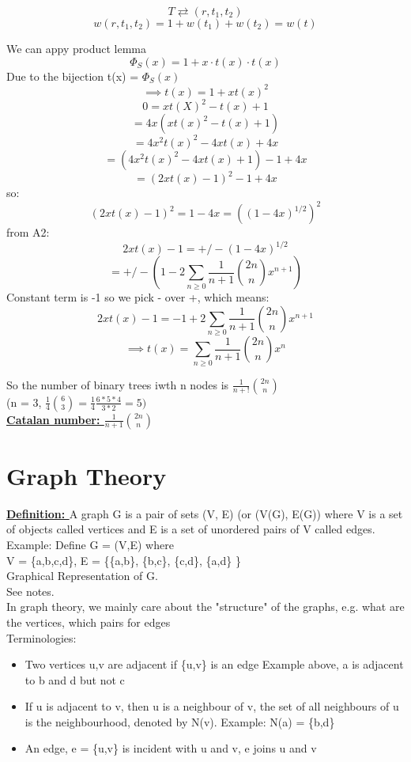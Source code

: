 \documentclass[12pt]{article}
\newcommand{\myt}[1]{\textbf{\underline{#1}}}
\begin{document}
	$$T \rightleftarrows (r, t_1, t_2)$$
	$$w(r, t_1, t_2) = 1 + w(t_1) + w(t_2) = w(t)$$
	
	We can appy product lemma
	$$\Phi_S(x) = 1 + x \cdot t(x) \cdot t(x)$$
	Due to the bijection t(x) = $\Phi_S(x)$\\
	$$\implies t(x) = 1 + xt(x)^2$$	
	$$0 = xt(X)^2 - t(x) + 1$$
	$$= 4x(xt(x)^2 - t(x) + 1)$$
	$$= 4x^2t(x)^2 - 4xt(x) + 4x$$
	$$= (4x^2t(x)^2 - 4xt(x) + 1) - 1 + 4x$$
	$$= (2xt(x) - 1)^2 - 1 + 4x$$
	so:
	$$(2xt(x)-1)^2 = 1 - 4x = ((1-4x)^{1/2})^2$$
	from A2:
	$$2xt(x) - 1 = +/-(1-4x)^{1/2}$$
	$$= +/-(1-2\sum_{n\geq 0}\frac{1}{n+1}{2n \choose n}x^{n+1})$$
	Constant term is -1 so we pick - over +, which means:
	$$2xt(x) - 1 = -1 + 2 \sum_{n \geq 0}\frac{1}{n+1}{2n \choose n}x^{n+1}$$
	$$\implies t(x) = \sum_{n\geq 0}\frac{1}{n+1}{2n \choose n}x^n$$
	
	So the number of binary trees iwth n nodes is $\frac{1}{n+!}{2n \choose n}$\\
	(n = 3, $\frac{1}{4}{6 \choose 3} = \frac{1}{4}\frac{6 * 5 * 4}{3 * 2} = 5)$\\
	
	\myt{Catalan number: $\frac{1}{n+1}{2n \choose n}$}\\
	
	\section*{Graph Theory}
	
	\myt{Definition: } A graph G is a pair of sets (V, E) (or (V(G), E(G)) where V is a set of objects called vertices and E is a set of unordered pairs of V called edges.\\
	
	Example: Define G = (V,E) where\\
	V = \{a,b,c,d\}, E = \{\{a,b\}, \{b,c\}, \{c,d\}, \{a,d\} \}\\
	
	Graphical Representation of G.\\
	See notes.\\
	
	In graph theory, we mainly care about the "structure" of the graphs, e.g. what are the vertices, which pairs for edges\\
	
	Terminologies:
	\begin{itemize}
		\item Two vertices u,v are adjacent if \{u,v\} is an edge Example above, a is adjacent to b and d but not c
		\item If u is adjacent to v, then u is a neighbour of v, the set of all neighbours of u is the neighbourhood, denoted by N(v). Example: N(a) = \{b,d\}
		\item An edge, e = \{u,v\} is incident with u and v, e joins u and v
	\end{itemize}
	
	
	
\end{document}
